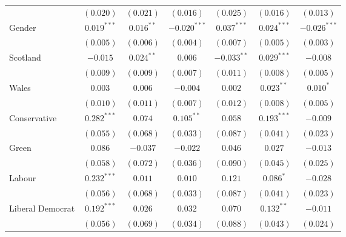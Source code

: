 \documentclass[12pt, letter]{article}
\begin{document}
\begin{table}[H]
\begin{center}
{\begin{tabular}{l c c c c c c}
                                 & $(0.020)$      & $(0.021)$      & $(0.016)$      & $(0.025)$      & $(0.016)$      & $(0.013)$      \\
Gender                           & $0.019^{***}$  & $0.016^{**}$   & $-0.020^{***}$ & $0.037^{***}$  & $0.024^{***}$  & $-0.026^{***}$ \\
                                 & $(0.005)$      & $(0.006)$      & $(0.004)$      & $(0.007)$      & $(0.005)$      & $(0.003)$      \\
Scotland                         & $-0.015$       & $0.024^{**}$   & $0.006$        & $-0.033^{**}$  & $0.029^{***}$  & $-0.008$       \\
                                 & $(0.009)$      & $(0.009)$      & $(0.007)$      & $(0.011)$      & $(0.008)$      & $(0.005)$      \\
Wales                            & $0.003$        & $0.006$        & $-0.004$       & $0.002$        & $0.023^{**}$   & $0.010^{*}$    \\
                                 & $(0.010)$      & $(0.011)$      & $(0.007)$      & $(0.012)$      & $(0.008)$      & $(0.005)$      \\
Conservative                     & $0.282^{***}$  & $0.074$        & $0.105^{**}$   & $0.058$        & $0.193^{***}$  & $-0.009$       \\
                                 & $(0.055)$      & $(0.068)$      & $(0.033)$      & $(0.087)$      & $(0.041)$      & $(0.023)$      \\
Green                            & $0.086$        & $-0.037$       & $-0.022$       & $0.046$        & $0.027$        & $-0.013$       \\
                                 & $(0.058)$      & $(0.072)$      & $(0.036)$      & $(0.090)$      & $(0.045)$      & $(0.025)$      \\
Labour                           & $0.232^{***}$  & $0.011$        & $0.010$        & $0.121$        & $0.086^{*}$    & $-0.028$       \\
                                 & $(0.056)$      & $(0.068)$      & $(0.033)$      & $(0.087)$      & $(0.041)$      & $(0.023)$      \\
Liberal Democrat                 & $0.192^{***}$  & $0.026$        & $0.032$        & $0.070$        & $0.132^{**}$   & $-0.011$       \\
                                 & $(0.056)$      & $(0.069)$      & $(0.034)$      & $(0.088)$      & $(0.043)$      & $(0.024)$      \\

\end{tabular}}
\end{center}
\end{table}
\end{document}
